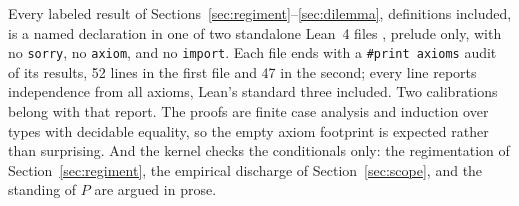 \documentclass[11pt]{article}
\newcommand{\lf}[1]{\texttt{#1}}
\begin{document}
Every labeled result of Sections~\ref{sec:regiment}--\ref{sec:dilemma}, definitions included, is a named declaration in one of two standalone Lean~4 files \cite{demoura2021}, prelude only, with no \lf{sorry}, no \lf{axiom}, and no \lf{import}. Each file ends with a \lf{\#print axioms} audit of its results, 52 lines in the first file and 47 in the second; every line reports independence from all axioms, Lean's standard three included. Two calibrations belong with that report. The proofs are finite case analysis and induction over types with decidable equality, so the empty axiom footprint is expected rather than surprising. And the kernel checks the conditionals only: the regimentation of Section~\ref{sec:regiment}, the empirical discharge of Section~\ref{sec:scope}, and the standing of $P$ are argued in prose.

\footnotesize
\end{document}
